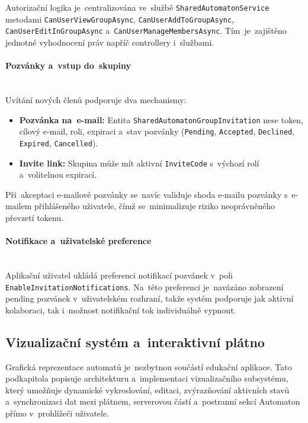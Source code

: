 \documentclass[
  master,
  program=ainfvs,
  printversion,
  figures=false,
  tables=false,
  glossaries,
  index
]{kidiplom}
\begin{document}
Autorizační logika je~centralizována ve~službě \texttt{Shared\-Automaton\-Service} metodami \texttt{Can\-User\-View\-Group\-Async}, \texttt{Can\-User\-Add\-To\-Group\-Async}, \texttt{Can\-User\-Edit\-In\-Group\-Async} a~\texttt{Can\-User\-Manage\-Members\-Async}. Tím~je~zajištěno jednotné vyhodnocení práv napříč controllery i~službami.

\paragraph{Pozvánky a~vstup do~skupiny} \mbox{} \\
Uvítání nových členů podporuje dva mechanismy:

\begin{itemize}
    \item \textbf{Pozvánka na~e-mail:} Entita \texttt{SharedAutomatonGroupInvitation} nese token, cílový e-mail, roli, expiraci a~stav pozvánky (\texttt{Pending}, \texttt{Acc\-ept\-ed}, \texttt{Declined}, \texttt{Expired}, \texttt{Cancelled}).
    \item \textbf{Invite link:} Skupina může mít aktivní \texttt{InviteCode} s~výchozí rolí a~volitelnou expirací.
\end{itemize}

Při~akceptaci e-mailové pozvánky se~navíc validuje shoda e-mailu pozvánky s~e-mailem přihlášeného uživatele, čímž se~minimalizuje riziko neoprávněného převzetí tokenu.

\paragraph{Notifikace a~uživatelské preference} \mbox{} \\
Aplikační uživatel ukládá preferenci notifikací pozvánek v~poli \texttt{Enable\-In\-vi\-ta\-tion\-Notifications}. Na~této preferenci je~navázáno zobrazení pending pozvánek v~uživatelském rozhraní, takže systém podporuje jak aktivní kolaboraci, tak i~možnost notifikační tok individuálně vypnout.

\subsection{Vizualizační systém a~interaktivní plátno} \label{par:canvas}
Grafická reprezentace automatů je~nezbytnou součástí edukační aplikace. Tato podkapitola popisuje architekturu a~implementaci vizualizačního subsystému, který umožňuje dynamické vykreslování, editaci, zvýrazňování aktivních stavů a~synchronizaci dat mezi plátnem, serverovou částí a~postranní sekcí Automaton přímo v~prohlížeči uživatele.
\end{document}
